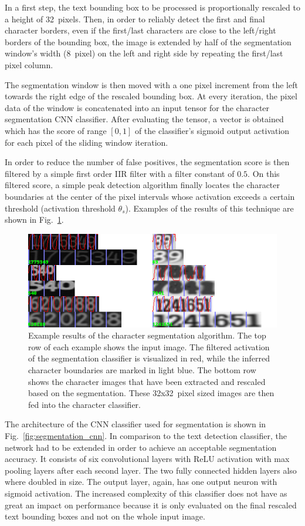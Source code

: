 \documentclass[12pt]{article}
\newcommand\figref[1]{Fig.~\ref{fig:#1}}
\begin{document}
In a first step, the text bounding box to be processed is proportionally rescaled to a height of 32~pixels.
Then, in order to reliably detect the first and final character borders, even if the first/last
characters are close to the left/right borders of the bounding box, the image is extended by
half of the segmentation window's width (8~pixel) on the left and right side by repeating the first/last
pixel column.

The segmentation window is then moved with a one pixel increment from the left towards the right
edge of the rescaled bounding box. At every iteration, the pixel data of the window is concatenated
into an input tensor for the character segmentation CNN classifier. After evaluating the
tensor, a vector is obtained which has the score of range $[0,1]$ of the classifier's sigmoid output activation
for each pixel of the sliding window iteration.

In order to reduce the number of false positives, the segmentation score is then filtered by
a simple first order IIR filter \cite{Infinite55:online} with a filter constant of $0.5$. On this
filtered score, a simple peak detection algorithm finally locates the character boundaries at
the center of the pixel intervals whose activation exceeds a certain threshold
(activation threshold $\theta_s$). Examples of the results of this technique are shown
in \figref{segmentation}.

\begin{figure}[ht]
    \centering
    \includegraphics[width=1.1\linewidth]{fig/segmentation}
    \caption{
      Example results of the character segmentation algorithm. The top row of each example shows the input
      image. The filtered activation of the segmentation classifier is visualized in red,
      while the inferred character boundaries are marked in light blue.
      The bottom row shows the character images that have been extracted and rescaled based on the
      segmentation. These 32x32~pixel sized images are then fed into the character classifier. }
    \label{fig:segmentation}
\end{figure}
\newpage
The architecture of the CNN classifier used for segmentation is shown in \figref{segmentation_cnn}.
In comparison to the text detection classifier, the network had to be extended in order
to achieve an acceptable segmentation accuracy. It consists of six convolutional layers
with ReLU activation with max pooling layers after each second layer. The two fully connected
hidden layers also where doubled in size. The output layer, again, has one output neuron
with sigmoid activation. The increased complexity of this classifier does not have as
great an impact on performance because it is only evaluated on the final rescaled text bounding boxes
and not on the whole input image.
\end{document}
